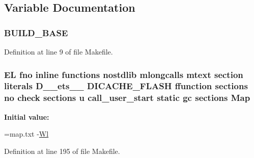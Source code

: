 \subsection{Variable Documentation}
\hypertarget{Makefile_aaa9bbf75d7f8fc94a5c7dd9504b7a178}{
\subsubsection[{B\-U\-I\-L\-D\-\_\-\-B\-A\-S\-E}]{\setlength{\rightskip}{0pt plus 5cm}B\-U\-I\-L\-D\-\_\-\-B\-A\-S\-E}}\label{Makefile_aaa9bbf75d7f8fc94a5c7dd9504b7a178}


Definition at line 9 of file Makefile.

\hypertarget{Makefile_a3f923b64cf6726ab0bfdd17b9aff0a96}{
\subsubsection[{Map}]{\setlength{\rightskip}{0pt plus 5cm}E\-L fno inline functions nostdlib mlongcalls mtext section literals D\-\_\-\-\_\-ets\-\_\-\-\_\- D\-I\-C\-A\-C\-H\-E\-\_\-\-F\-L\-A\-S\-H ffunction sections no check sections u call\-\_\-user\-\_\-start static gc sections Map\hspace{0.3cm}{\ttfamily [static]}}}\label{Makefile_a3f923b64cf6726ab0bfdd17b9aff0a96}
{\bfseries Initial value\-:}
\begin{DoxyCode}
=map.txt  
-\hyperlink{Makefile_afb1782b240d70229ae5bc6b111f9794a}{Wl}
\end{DoxyCode}


Definition at line 195 of file Makefile.

